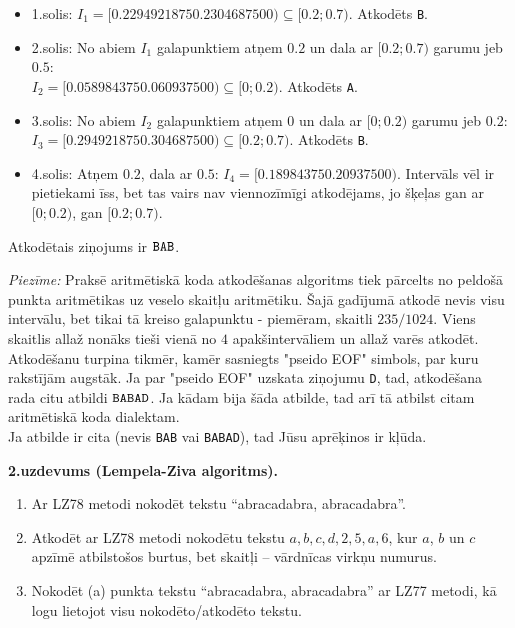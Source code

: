 \documentclass[a4paper,12pt]{article}
\begin{document}
{\begin{itemize}
\item 1.solis: $I_1 = [0.2294921875 0.2304687500) \subseteq [0.2;0.7)$. Atkodēts {\tt B}.
\item 2.solis: No abiem $I_1$ galapunktiem atņem $0.2$ un dala ar $[0.2;0.7)$ garumu jeb $0.5$:\\
$I_2 = [0.058984375 0.060937500) \subseteq [0;0.2)$. Atkodēts {\tt A}.
\item 3.solis: No abiem $I_2$ galapunktiem atņem $0$ un dala ar $[0;0.2)$ garumu jeb $0.2$:\\
$I_3 = [0.294921875 0.304687500) \subseteq [0.2;0.7)$. Atkodēts {\tt B}.
\item 4.solis: Atņem $0.2$, dala ar $0.5$: $I_4 = [0.18984375 0.20937500)$. Intervāls vēl ir pietiekami 
īss, bet tas vairs nav viennozīmīgi atkodējams, jo šķeļas gan ar $[0;0.2)$, gan $[0.2;0.7)$. 
\end{itemize}

Atkodētais ziņojums ir ${\tt BAB}$. 

{\em Piezīme:} Praksē aritmētiskā koda atkodēšanas algoritms tiek pārcelts no peldošā punkta aritmētikas uz veselo skaitļu aritmētiku. 
Šajā gadījumā atkodē nevis visu intervālu, bet tikai tā kreiso galapunktu - piemēram, skaitli $235/1024$. 
Viens skaitlis allaž nonāks tieši vienā no $4$ apakšintervāliem un allaž varēs atkodēt.
Atkodēšanu turpina tikmēr, kamēr sasniegts "pseido EOF" simbols, par kuru rakstījām augstāk. 
Ja par "pseido EOF" uzskata ziņojumu {\tt D}, tad, atkodēšana rada citu atbildi ${\tt BABAD}$. 
Ja kādam bija šāda atbilde, tad arī tā atbilst citam aritmētiskā koda dialektam.\\
Ja atbilde ir cita (nevis {\tt BAB} vai {\tt BABAD}), tad Jūsu aprēķinos ir kļūda.

}







{\bf 2.uzdevums (Lempela-Ziva algoritms).}

\begin{enumerate}[label=(\alph*)]
\item 
Ar LZ78 metodi nokodēt tekstu “abracadabra, abracadabra”.
\item Atkodēt ar LZ78 metodi nokodētu tekstu $a,b,c,d,2,5,a,6$, kur
$a$, $b$ un $c$ apzīmē atbilstošos burtus, bet skaitļi – vārdnīcas virkņu
numurus.
\item
Nokodēt (a) punkta tekstu “abracadabra, abracadabra” 
ar LZ77 metodi, kā logu lietojot visu nokodēto/atkodēto tekstu.
\end{enumerate}
\end{document}
